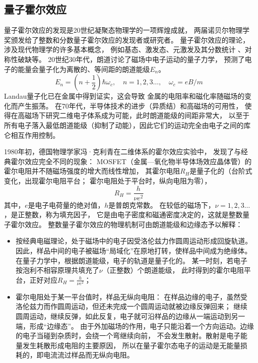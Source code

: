\documentclass{article}
\begin{document}
\subsection{量子霍尔效应}
量子霍尔效应的发现是20世纪凝聚态物理学的一项辉煌成就，
两届诺贝尔物理学奖颁发给了整数和分数量子霍尔效应的发现者或研究者。
量子霍尔效应的理论，涉及现代物理学的许多基本概念，
例如基态、激发态、元激发及其分数统计 、对称性破缺等。
20世纪30年代，朗道讨论了磁场中电子运动的量子力学，
预测了电子的能量会量子化为离散的、等间距的朗道能级$E_n$。
\begin{equation*}
    E_n=(n+\frac{1}{2})\hbar\omega_c,\quad n=1,2,3\dots,\quad\omega_c=eB/m
\end{equation*}
Landau量子化已在金属中得到证实，这会导致
金属的电阻率和磁化率随磁场的变化而产生振荡。
在70年代，半导体技术的进步（异质结）和高磁场的可用性，
使得在高磁场下研究二维电子体系成为可能，此时朗道能级的间距非常大，
以至于所有电子落入最低朗道能级（抑制了动能），因此它们的运动完全由电子之间的库仑相互作用控制。

1980年初，德国物理学家冯·克利青在二维体系的霍尔效应实验中，
发现了与经典霍尔效应完全不同的现象：
MOSFET（金属—氧化物半导体场效应晶体管）的霍尔电阻并不随磁场强度的增大而线性增加，
其霍尔电阻$R_H$是量子化的（台阶式变化，出现霍尔电阻平台；
霍尔电阻处于平台时，纵向电阻为零），
\begin{equation*}
    R_H=\frac{h}{\nu e^2}
\end{equation*}
其中，$e$是电子电荷量的绝对值，$h$是普朗克常数。
在较低的磁场下，$\nu=1,2,3\dots$，是正整数，称为填充因子，
它是由电子密度和磁通密度决定的，这就是整数量子霍尔效应。
整数量子霍尔效应的物理机制可由朗道能级和边缘态予以解释：
\begin{itemize}
    \item 按经典电磁理论，处于磁场中的电子因受洛伦兹力作圆周运动形成回旋轨道。
    因此，样品中间的电子被磁场“局域化”在原地打转，使样品中间成为绝缘体。
    在量子力学中，根据朗道能级，电子的轨道是量子化的。
    某一时刻，若电子按泡利不相容原理共填充了$\nu$（正整数）个朗道能级，
    此时得到的霍尔电阻平台，正好对应$R_H=\frac{h}{\nu e^2}$； 
    \item 霍尔电阻处于某一平台值时，样品无纵向电阻：
    在样品边缘的电子，虽然受洛伦兹力而作圆周运动，但还未完成一个圆周运动就被边缘反弹回来；
    继续圆周运动，继续反弹，如此反复，电子就可沿样品的边缘从一端运动到另一端，形成“边缘态”。
    由于外加磁场的作用，电子只能沿着一个方向运动。边缘的电子当碰到杂质时，会绕一个弯继续向前，
    不会发生散射。散射是电子能量发生耗散形成电阻的主要原因，
    所以在量子霍尔态电子的运动是无能量损耗的，即电流流过样品而无纵向电阻。
\end{itemize} 
\end{document}
